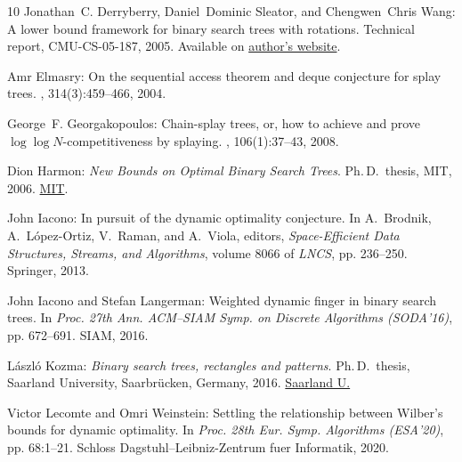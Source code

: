 \begin{thebibliography}{10}
{\sc Jonathan~C. Derryberry, Daniel~Dominic Sleator, and Chengwen~Chris Wang}:
  A lower bound framework for binary search trees with rotations.
\newblock Technical report, CMU-CS-05-187, 2005.
\newblock Available on
  \href{https://www.cs.cmu.edu/~jonderry/lower-bound.pdf}{author's website}.

{\sc Amr Elmasry}: On the sequential access theorem and deque conjecture for
  splay trees.
, 314(3):459--466, 2004.

{\sc George~F. Georgakopoulos}: Chain-splay trees, or, how to achieve and prove
  {$\log\log N$}-competitiveness by splaying.
, 106(1):37--43, 2008.

{\sc Dion Harmon}: {\em New Bounds on Optimal Binary Search Trees}.
\newblock Ph.\,D.\ thesis, MIT, 2006.
\newblock
  \href{https://dspace.mit.edu/bitstream/handle/1721.1/34268/71014527-MIT.pdf}{MIT}.

{\sc John Iacono}: In pursuit of the dynamic optimality conjecture.
\newblock In {\sc A.~Brodnik, A.~López-Ortiz, V.~Raman, and A.~Viola},
  editors, {\em Space-Efficient Data Structures, Streams, and Algorithms},
  volume 8066 of {\em LNCS}, pp. 236--250. Springer, 2013.
\newblock [\epfmtdoi{10.1007/978-3-642-40273-9\_16}]

{\sc John Iacono and Stefan Langerman}: Weighted dynamic finger in binary
  search trees.
\newblock In {\em Proc. 27th Ann. ACM--SIAM Symp. on Discrete Algorithms
  (SODA'16)}, pp. 672--691. SIAM, 2016.
\newblock [\epfmtdoi{10.1137/1.9781611974331.ch49}]

{\sc L\'aszl\'o Kozma}: {\em Binary search trees, rectangles and patterns}.
\newblock Ph.\,D.\ thesis, Saarland University, Saarbr{\"{u}}cken, Germany,
  2016.
\newblock
  \href{http://scidok.sulb.uni-saarland.de/volltexte/2016/6646/}{Saarland U.}

{\sc Victor Lecomte and Omri Weinstein}: Settling the relationship between
  {W}ilber’s bounds for dynamic optimality.
\newblock In {\em Proc. 28th Eur. Symp. Algorithms (ESA'20)}, pp. 68:1--21.
  Schloss Dagstuhl--Leibniz-Zentrum fuer Informatik, 2020.


\end{thebibliography}

